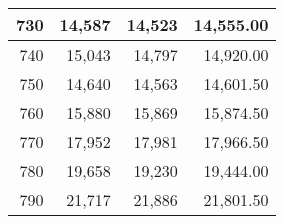 \begin{longtable}{|r|r|r|r|}
		730                                                                                                                   & 14,587                                               & 14,523                                               & 14,555.00                                                                                                              \\ \hline
		740                                                                                                                   & 15,043                                               & 14,797                                               & 14,920.00                                                                                                              \\ \hline
		750                                                                                                                   & 14,640                                               & 14,563                                               & 14,601.50                                                                                                              \\ \hline
		760                                                                                                                   & 15,880                                               & 15,869                                               & 15,874.50                                                                                                              \\ \hline
		770                                                                                                                   & 17,952                                               & 17,981                                               & 17,966.50                                                                                                              \\ \hline
		780                                                                                                                   & 19,658                                               & 19,230                                               & 19,444.00                                                                                                              \\ \hline
		790                                                                                                                   & 21,717                                               & 21,886                                               & 21,801.50                                                                                                              \\ \hline

\end{longtable}
